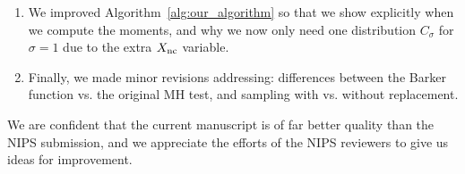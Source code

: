 \documentclass[twoside]{article} \usepackage{aistats2017}
\begin{document}
\begin{enumerate}
    \item We improved Algorithm~\ref{alg:our_algorithm} so that we show
    explicitly when we compute the moments, and why we now only need one
    distribution $C_\sigma$ for $\sigma=1$ due to the extra $X_{\rm nc}$
    variable.

    \item Finally, we made minor revisions addressing: differences between the
    Barker function vs. the original MH test, and sampling with vs. without
    replacement.
\end{enumerate}

We are confident that the current manuscript is of far better quality than the
NIPS submission, and we appreciate the efforts of the NIPS reviewers to give us
ideas for improvement.
\end{document}
